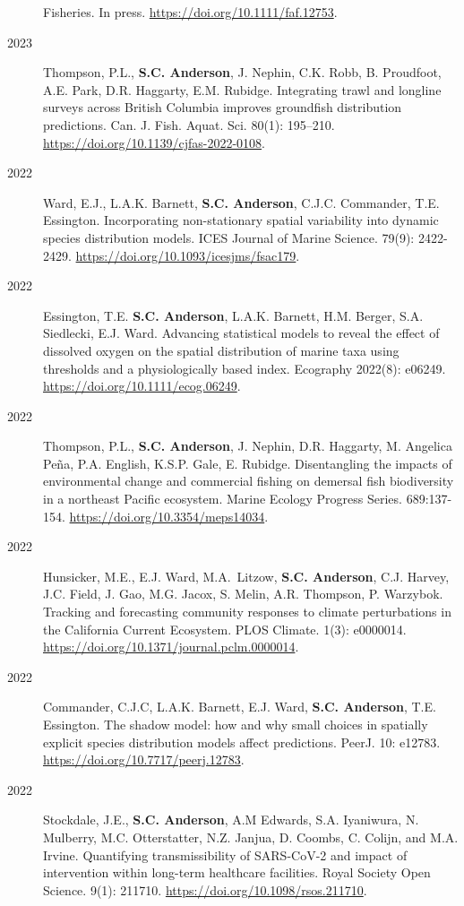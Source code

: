 \begin{description}
Fisheries. In press. \url{https://doi.org/10.1111/faf.12753}.
\item[2023]
Thompson, P.L., \textbf{S.C. Anderson}, J. Nephin, C.K. Robb, B.
Proudfoot, A.E. Park, D.R. Haggarty, E.M. Rubidge. Integrating trawl and
longline surveys across British Columbia improves groundfish
distribution predictions. Can. J. Fish. Aquat. Sci. 80(1): 195--210.
\url{https://doi.org/10.1139/cjfas-2022-0108}.
\item[2022]
Ward, E.J., L.A.K. Barnett, \textbf{S.C. Anderson}, C.J.C. Commander,
T.E. Essington. Incorporating non-stationary spatial variability into
dynamic species distribution models. ICES Journal of Marine Science.
79(9): 2422-2429. \url{https://doi.org/10.1093/icesjms/fsac179}.
\item[2022]
Essington, T.E. \textbf{S.C. Anderson}, L.A.K. Barnett, H.M. Berger,
S.A. Siedlecki, E.J. Ward. Advancing statistical models to reveal the
effect of dissolved oxygen on the spatial distribution of marine taxa
using thresholds and a physiologically based index. Ecography 2022(8):
e06249. \url{https://doi.org/10.1111/ecog.06249}.
\item[2022]
Thompson, P.L., \textbf{S.C. Anderson}, J. Nephin, D.R. Haggarty, M.
Angelica Peña, P.A. English, K.S.P. Gale, E. Rubidge. Disentangling the
impacts of environmental change and commercial fishing on demersal fish
biodiversity in a northeast Pacific ecosystem. Marine Ecology Progress
Series. 689:137-154. \url{https://doi.org/10.3354/meps14034}.
\item[2022]
Hunsicker, M.E., E.J. Ward, M.A.\ Litzow, \textbf{S.C. Anderson}, C.J.
Harvey, J.C. Field, J. Gao, M.G. Jacox, S. Melin, A.R. Thompson, P.
Warzybok. Tracking and forecasting community responses to climate
perturbations in the California Current Ecosystem. PLOS Climate. 1(3):
e0000014. \url{https://doi.org/10.1371/journal.pclm.0000014}.
\item[2022]
Commander, C.J.C, L.A.K. Barnett, E.J. Ward, \textbf{S.C. Anderson},
T.E. Essington. The shadow model: how and why small choices in spatially
explicit species distribution models affect predictions. PeerJ. 10:
e12783. \url{https://doi.org/10.7717/peerj.12783}.
\item[2022]
Stockdale, J.E., \textbf{S.C. Anderson}, A.M Edwards, S.A. Iyaniwura, N.
Mulberry, M.C. Otterstatter, N.Z. Janjua, D. Coombs, C. Colijn, and M.A.
Irvine. Quantifying transmissibility of SARS-CoV-2 and impact of
intervention within long-term healthcare facilities. Royal Society Open
Science. 9(1): 211710. \url{https://doi.org/10.1098/rsos.211710}.

\end{description}
